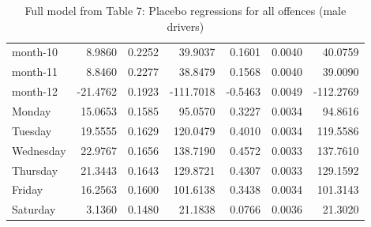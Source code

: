 \documentclass[10pt]{article}
\begin{document}
\begin{table}[ht]
\begin{tabular}{lrrrrrr}
  month-10 & 8.9860 & 0.2252 & 39.9037 & 0.1601 & 0.0040 & 40.0759 \\ 
  month-11 & 8.8460 & 0.2277 & 38.8479 & 0.1568 & 0.0040 & 39.0090 \\ 
  month-12 & -21.4762 & 0.1923 & -111.7018 & -0.5463 & 0.0049 & -112.2769 \\ 
  Monday & 15.0653 & 0.1585 & 95.0570 & 0.3227 & 0.0034 & 94.8616 \\ 
  Tuesday & 19.5555 & 0.1629 & 120.0479 & 0.4010 & 0.0034 & 119.5586 \\ 
  Wednesday & 22.9767 & 0.1656 & 138.7190 & 0.4572 & 0.0033 & 137.7610 \\ 
  Thursday & 21.3443 & 0.1643 & 129.8721 & 0.4307 & 0.0033 & 129.1592 \\ 
  Friday & 16.2563 & 0.1600 & 101.6138 & 0.3438 & 0.0034 & 101.3143 \\ 
  Saturday & 3.1360 & 0.1480 & 21.1838 & 0.0766 & 0.0036 & 21.3020 \\ 
   \hline
\end{tabular}
\caption{Full model from Table 7: Placebo regressions for all offences (male drivers)} 
\label{tab_7_all_pts_no_age_M}
\end{table}


\clearpage
\pagebreak



\end{document}
